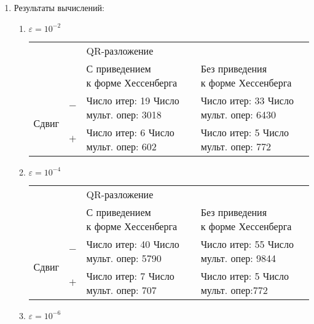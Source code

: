 \documentclass[12pt]{article}
\begin{document}
\begin{enumerate}	
\item Результаты вычислений:
	\begin{enumerate}
	\item $\varepsilon=10^{-2}$\\
	\begin{adjustwidth}{-3cm}{}
	\begin{tabular}{|l|l|l|l|}
		\hline
		\multirow{2}{*}{} & \multirow{2}{*}{} & \multicolumn{2}{l|}{QR-разложение} \\ \cline{3-4} 
		&                   &   \pbox{20cm}{С приведением\\ к форме Хессенберга}      &  \pbox{20cm}{Без приведения\\ к форме Хессенберга}        \\ \hline
		\multirow{2}{*}{Сдвиг} &    $-$               &  Число итер: 19 Число мульт. опер: 3018   &        Число итер: 33 Число мульт. опер: 6430   \\ \cline{2-4} 
		&    $+$              &     Число итер: 6 Число мульт. опер: 602     &        Число итер: 5 Число мульт. опер: 772   \\ \hline
	\end{tabular}
	\end{adjustwidth}
	\item $\varepsilon=10^{-4}$\\
	\begin{adjustwidth}{-3cm}{}
	\begin{tabular}{|l|l|l|l|}
		\hline
		\multirow{2}{*}{} & \multirow{2}{*}{} & \multicolumn{2}{l|}{QR-разложение} \\ \cline{3-4} 
		&                   &  \pbox{20cm}{С приведением\\ к форме Хессенберга}      &  \pbox{20cm}{Без приведения\\ к форме Хессенберга}        \\ \hline
		\multirow{2}{*}{Сдвиг} &    $-$               &     Число итер: 40 Число мульт. опер: 5790 &        Число итер: 55 Число мульт. опер:  9844  \\ \cline{2-4} 
		&    $+$              &         Число итер: 7 Число мульт. опер:  707 &      Число итер: 5 Число мульт. опер:772      \\ \hline
	\end{tabular}
	\end{adjustwidth}
	\item $\varepsilon=10^{-6}$\\
	\begin{adjustwidth}{-3cm}{}

\end{adjustwidth}
\end{enumerate}
\end{enumerate}
\end{document}
